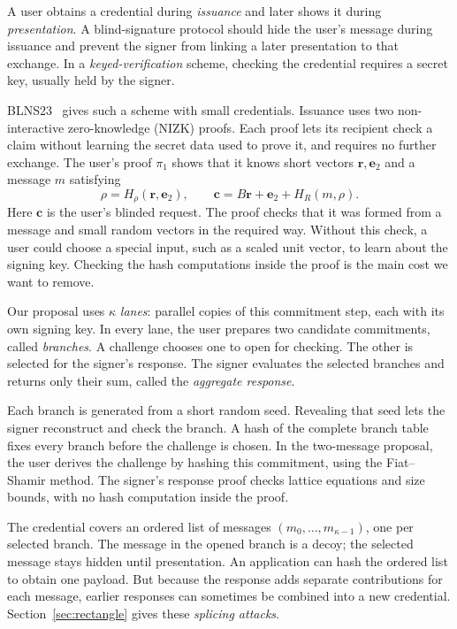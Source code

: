 \documentclass[10pt]{article}
\begin{document}
A user obtains a credential during \emph{issuance} and later shows it during
\emph{presentation}.  A blind-signature protocol should hide the user's
message during issuance and prevent the signer from linking a later
presentation to that exchange.  In a \emph{keyed-verification} scheme, checking
the credential requires a secret key, usually held by the signer.

BLNS23~\cite{BLNS23} gives such a scheme with small credentials.  Issuance
uses two non-interactive zero-knowledge (NIZK) proofs.  Each proof lets its
recipient check a claim without learning the secret data used to prove it,
and requires no further exchange.  The user's proof $\pi_1$ shows that it
knows short vectors $\mathbf r,\mathbf e_2$ and a message $m$ satisfying
\[
  \rho=H_\rho(\mathbf r,\mathbf e_2),\qquad
  \mathbf c=B\mathbf r+\mathbf e_2+H_R(m,\rho).
\]
Here $\mathbf c$ is the user's blinded request.  The proof checks that it
was formed from a message and small random vectors in the required way.
Without this check, a user could choose a special input, such as a scaled
unit vector, to learn about the signing key.  Checking the hash computations
inside the proof is the main cost we want to remove.

Our proposal uses $\kappa$ \emph{lanes}: parallel copies of this commitment
step, each with its own signing key.  In every lane, the user prepares two
candidate commitments, called \emph{branches}.  A challenge chooses one to
open for checking.  The other is selected for the signer's response.  The
signer evaluates the selected branches and returns only their sum, called the
\emph{aggregate response}.

Each branch is generated from a short random seed.  Revealing that seed lets
the signer reconstruct and check the branch.  A hash of the complete branch
table fixes every branch before the challenge is chosen.  In the two-message
proposal, the user derives the challenge by hashing this commitment, using
the Fiat--Shamir method.  The signer's response proof checks lattice equations
and size bounds, with no hash computation inside the proof.

The credential covers an ordered list of messages
$(m_0,\ldots,m_{\kappa-1})$, one per selected branch.  The message in the
opened branch is a decoy; the selected message stays hidden until
presentation.  An application can hash the ordered list to obtain one
payload.  But because the response adds separate contributions for each
message, earlier responses can sometimes be combined into a new credential.
Section~\ref{sec:rectangle} gives these \emph{splicing attacks}.
\end{document}
